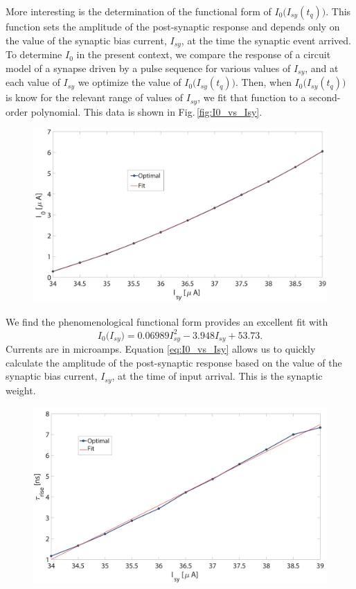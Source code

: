 \documentclass[]{article}
\begin{document}
More interesting is the determination of the functional form of $I_0\big(I_{sy}(t_q)\big)$. This function sets the amplitude of the post-synaptic response and depends only on the value of the synaptic bias current, $I_{sy}$, at the time the synaptic event arrived. To determine $I_0$ in the present context, we compare the response of a circuit model of a synapse driven by a pulse sequence for various values of $I_{sy}$, and at each value of $I_{sy}$ we optimize the value of $I_0\big(I_{sy}(t_q)\big)$. Then, when $I_0\big(I_{sy}(t_q)\big)$ is know for the relevant range of values of $I_{sy}$, we fit that function to a second-order polynomial. This data is shown in Fig.\,\ref{fig:I0_vs_Isy}.
\begin{figure}[t!]
\centering
\includegraphics[width=17.2cm]{_I0_vs_Isy.pdf}
\end{figure}
We find the phenomenological functional form provides an excellent fit with
\begin{equation}
\label{eq:I0_vs_Isy}
I_{0}\big(I_{sy}\big) = 0.06989 I_{sy}^2 - 3.948 I_{sy} + 53.73.
\end{equation}
Currents are in microamps. Equation \ref{eq:I0_vs_Isy} allows us to quickly calculate the amplitude of the post-synaptic response based on the value of the synaptic bias current, $I_{sy}$, at the time of input arrival. This is the synaptic weight.
\begin{figure}[h!]
\centering
\includegraphics[width=17.2cm]{_tau_rise_vs_Isy.pdf}
\end{figure}
\end{document}
